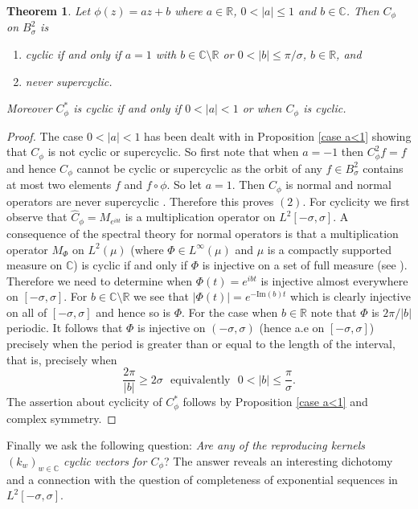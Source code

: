 \documentclass[11pt]{amsart}%
\numberwithin{equation}{section}
\theoremstyle{plain}
\newtheorem{thm}{Theorem}[section]
\theoremstyle{definition}
\theoremstyle{definition}
\begin{document}
\begin{thm}\label{cyclic}Let $\phi(z)=az+b$ where $a\in\mathbb{R}$, $0<|a|\leq 1$ and $b\in \mathbb{C}$. Then $C_{\phi}$ on $B^2_\sigma$ is
\begin{enumerate}
\item cyclic if and only if $a=1$ with $b\in\mathbb{C}\setminus\mathbb{R}$ or $0<|b|\leq\pi/\sigma$, $b\in\mathbb{R}$, and
\item never supercyclic.
\end{enumerate}
Moreover $C_\phi^*$ is cyclic if and only if $0<|a|<1$ or when $C_\phi$ is cyclic.
\end{thm}
\begin{proof} The case $0<|a|<1$ has been dealt with in Proposition \ref{case a<1} showing that $C_\phi$ is not cyclic or supercyclic. So first note that when $a=-1$ then $C_\phi^2f=f$ and hence $C_\phi$ cannot be cyclic or supercyclic as the orbit of any $f\in B^2_\sigma$ contains at most two elements $f$ and $f\circ\phi$. So let $a=1$. Then $C_\phi$ is normal and normal operators are never supercyclic \cite[p. 564]{Hilden}. Therefore this proves $(2)$. For cyclicity we first observe that $\widehat{C}_\phi=M_{e^{ibt}}$ is a multiplication operator on $L^2[-\sigma,\sigma]$. A consequence of the spectral theory for normal operators is that a multiplication operator $M_\Phi$ on $L^2(\mu)$ (where $\Phi\in L^\infty(\mu)$ and $\mu$ is a compactly supported measure on $\mathbb{C}$) is cyclic if and only if $\Phi$ is injective on a set of full measure (see \cite[Thm. 1.1 and Prop. 1.3]{Ross}). Therefore we need to determine when $\Phi(t)=e^{ibt}$ is injective almost everywhere on $[-\sigma,\sigma]$. For $b\in\mathbb{C}\setminus\mathbb{R}$ we see that $|\Phi(t)|=e^{-\mathrm{Im}(b)t}$ which is clearly injective on all of $[-\sigma,\sigma]$ and hence so is $\Phi$. For the case when $b\in\mathbb{R}$ note that $\Phi$ is $2\pi/|b|$ periodic. It follows that $\Phi$ is injective on $(-\sigma,\sigma)$ (hence a.e on $[-\sigma,\sigma]$) precisely when the period is greater than or equal to the length of the interval, that is, precisely when
\[
\frac{2\pi}{|b|}\geq 2\sigma \ \ \ \mathrm{equivalently} \ \ \ 0<|b|\leq\frac{\pi}{\sigma}.
\]
The assertion about cyclicity of $C_\phi^*$ follows by Proposition \ref{case a<1} and complex symmetry. 
\end{proof}
Finally we ask the following question: \emph{Are any of the reproducing kernels $(k_w)_{w\in\mathbb{C}}$ cyclic vectors for $C_\phi$}? The answer reveals an interesting dichotomy and a connection with the question of completeness of exponential sequences in $L^2[-\sigma,\sigma]$. 
\end{document}
